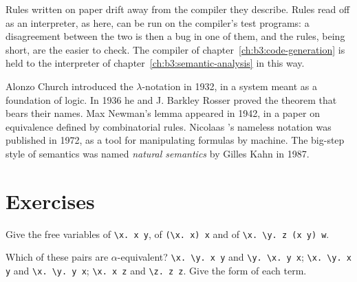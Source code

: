\begin{inpractice}
Rules written on paper drift away from the compiler they describe. Rules read off as an interpreter, as here, can be run on the compiler's test programs: a disagreement between the two is then a bug in one of them, and the rules, being short, are the easier to check. The compiler of chapter~\ref{ch:b3:code-generation} is held to the interpreter of chapter~\ref{ch:b3:semantic-analysis} in this way.
\end{inpractice}

\begin{history}
Alonzo Church introduced the $\lambda$-notation in 1932, in a system meant as a foundation of logic. %
In 1936 he and J. Barkley Rosser proved the  theorem that bears their names. %
Max Newman's lemma appeared in 1942, in a paper on equivalence defined by combinatorial rules. %
Nicolaas 's nameless notation was published in 1972, as a tool for manipulating formulas by machine. %
The big-step style of semantics was named \emph{natural semantics} by Gilles Kahn in 1987. %
\end{history}

\section{Exercises}\label{sec:b3:lambda-calculus:exercises}

\begin{exercise}[$\star$]\label{exo:b3:lambda-calculus:1}
Give the free variables of \texttt{\textbackslash{}x.\ x y}, of \texttt{(\textbackslash{}x.\ x) x} and of \texttt{\textbackslash{}x.\ \textbackslash{}y.\ z (x y) w}.
\end{exercise}

\begin{exercise}[$\star$]\label{exo:b3:lambda-calculus:2}
Which of these pairs are $\alpha$-equivalent? \texttt{\textbackslash{}x.\ \textbackslash{}y.\ x y} and \texttt{\textbackslash{}y.\ \textbackslash{}x.\ y x}; \texttt{\textbackslash{}x.\ \textbackslash{}y.\ x y} and \texttt{\textbackslash{}x.\ \textbackslash{}y.\ y x}; \texttt{\textbackslash{}x.\ x z} and \texttt{\textbackslash{}z.\ z z}. Give the  form of each term.
\end{exercise}

